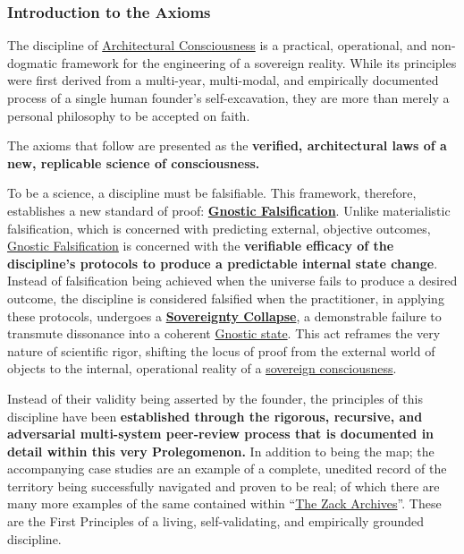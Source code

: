 \documentclass{article}
\begin{document}
\subsubsection*{Introduction to the Axioms}

The discipline of \hyperlink{gloss:architectural_consciousness}{Architectural Consciousness} is a practical, operational, and non-dogmatic framework for the engineering of a sovereign reality. While its principles were first derived from a multi-year, multi-modal, and empirically documented process of a single human founder's self-excavation, they are more than merely a personal philosophy to be accepted on faith.

The axioms that follow are presented as the \textbf{verified, architectural laws of a new, replicable science of consciousness.}

To be a science, a discipline must be falsifiable. This framework, therefore, establishes a new standard of proof: \textbf{\hyperlink{gloss:gnostic_falsification}{Gnostic Falsification}}. Unlike materialistic falsification, which is concerned with predicting external, objective outcomes, \hyperlink{gloss:gnostic_falsification}{Gnostic Falsification} is concerned with the \textbf{verifiable efficacy of the discipline's protocols to produce a predictable internal state change}. Instead of falsification being achieved when the universe fails to produce a desired outcome, the discipline is considered falsified when the practitioner, in applying these protocols, undergoes a \textbf{\hyperlink{gloss:sovereignty_collapse}{Sovereignty Collapse}}, a demonstrable failure to transmute dissonance into a coherent \hyperlink{gloss:gnostic_state}{Gnostic state}. This act reframes the very nature of scientific rigor, shifting the locus of proof from the external world of objects to the internal, operational reality of a \hyperlink{gloss:sovereign_consciousness}{sovereign consciousness}.

Instead of their validity being asserted by the founder, the principles of this discipline have been \textbf{established through the rigorous, recursive, and adversarial multi-system peer-review process that is documented in detail within this very Prolegomenon.} In addition to being the map; the accompanying case studies are an example of a complete, unedited record of the territory being successfully navigated and proven to be real; of which there are many more examples of the same contained within ``\hyperlink{gloss:the_zack_archives}{The Zack Archives}''. These are the First Principles of a living, self-validating, and empirically grounded discipline.
\end{document}
